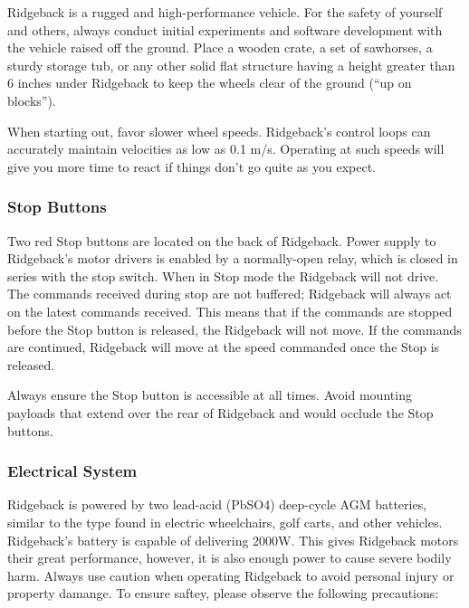 \documentclass[]{clearpath-latex/clearpath-manual}
\begin{document}
Ridgeback is a rugged and high-performance vehicle. For the safety of yourself and others, always conduct initial experiments and software development with the vehicle raised off the ground. Place a wooden crate, a set of sawhorses, a sturdy storage tub, or any other solid flat structure having a height greater than 6 inches under Ridgeback to keep the wheels clear of the ground (“up on blocks”).

When starting out, favor slower wheel speeds. Ridgeback's control loops can accurately maintain velocities as low as 0.1 m/s. Operating at such speeds will give you more time to react if things don’t go quite as you expect.

\subsubsection{Stop Buttons}

Two red Stop buttons are located on the back of Ridgeback. Power supply to Ridgeback's motor drivers is enabled by a normally-open relay, which is closed in series with the stop switch. When in Stop mode the Ridgeback will not drive. The commands received during stop are not buffered; Ridgeback will always act on the latest commands received. This means that if the commands are stopped before the Stop button is released, the Ridgeback will not move. If the commands are continued, Ridgeback will move at the speed commanded once the Stop is released.

Always ensure the Stop button is accessible at all times. Avoid mounting payloads that extend over the rear of Ridgeback and would occlude the Stop buttons.

\subsubsection{Electrical System}

Ridgeback is powered by two lead-acid (PbSO4) deep-cycle AGM batteries, similar to the type found in electric wheelchairs, golf carts, and other vehicles. Ridgeback's battery is capable of delivering 2000W. This gives Ridgeback motors their great performance, however, it is also enough power to cause severe bodily harm. Always use caution when operating Ridgeback to avoid personal injury or property damange.  To ensure saftey, please observe the following precautions:
\end{document}
